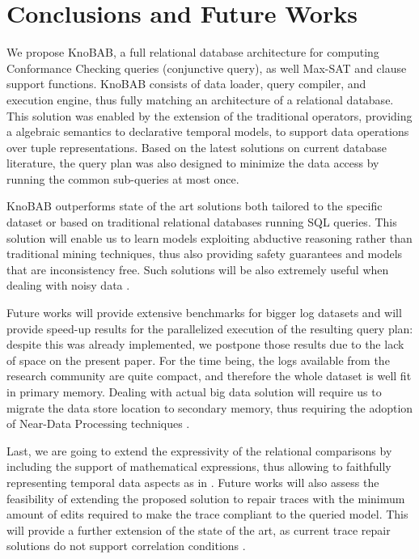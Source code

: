 \section{Conclusions and Future Works}
We propose KnoBAB, a full relational database architecture for computing Conformance Checking queries (conjunctive query), as well Max-SAT and clause support functions.  KnoBAB consists of data loader, query compiler, and execution engine, thus fully matching an architecture of a relational database. This solution was enabled by the extension of the traditional \LTLf operators, providing a algebraic semantics to declarative temporal models, to support data operations over tuple representations. Based on the latest solutions on current database literature, the query plan was also designed to minimize the data access by running the common sub-queries at most once.

KnoBAB outperforms state of the art solutions both tailored to the specific dataset or based on traditional relational databases running SQL queries.  This solution will enable us to learn models exploiting abductive reasoning rather than traditional mining techniques, thus also providing safety guarantees and models that are inconsistency free. Such solutions will be also extremely useful when dealing with noisy data \cite{PicadoDTL20}.

Future works will provide extensive benchmarks for bigger log datasets and will provide speed-up results for the parallelized execution of the resulting query plan: despite this was already implemented, we postpone those results due to the lack of space on the present paper. For the time being, the logs available from the research community are quite compact, and therefore the whole dataset is well fit in primary memory. Dealing with actual big data solution will require us to migrate the data store location to secondary memory, thus requiring the adoption of Near-Data Processing techniques \cite{GuYBJLYKKYCJC16}. 

Last, we are going to extend the expressivity of the relational comparisons by including the support of mathematical expressions, thus allowing to faithfully representing temporal data aspects as in \cite{BurattinMS16}. Future works will also assess the feasibility of extending the proposed solution to repair traces with the minimum amount of edits required to make the trace compliant to the queried model. This will provide a further extension of the state of the art, as current trace repair solutions do not support correlation conditions \cite{bpm21}.

